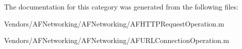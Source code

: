 The documentation for this category was generated from the following files\+:\begin{DoxyCompactItemize}
\item 
Vendors/\+A\+F\+Networking/\+A\+F\+Networking/A\+F\+H\+T\+T\+P\+Request\+Operation.\+m\item 
Vendors/\+A\+F\+Networking/\+A\+F\+Networking/A\+F\+U\+R\+L\+Connection\+Operation.\+m\end{DoxyCompactItemize}
